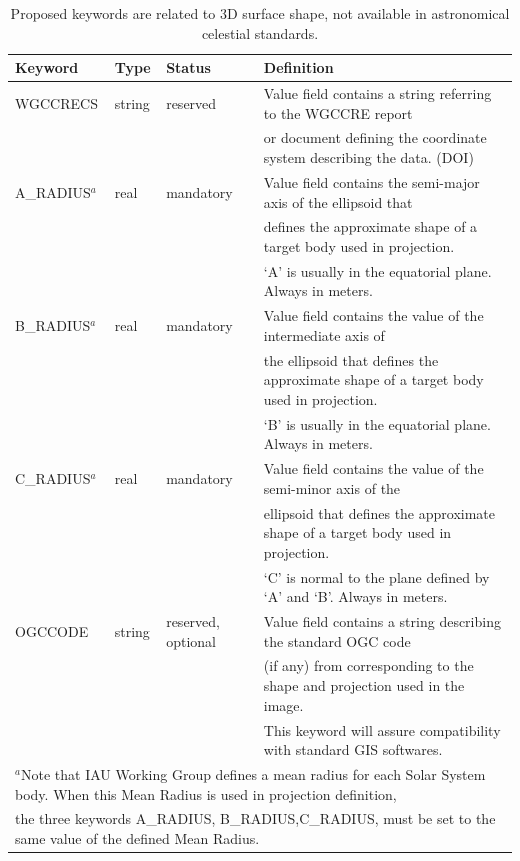 \begin{table}
\caption{Proposed keywords are related to 3D surface shape,
not available in astronomical celestial standards.}
\centering
\begin{tabular}{l l l l}
\hline
Keyword & Type & Status & Definition  \\
\hline
WGCCRECS & string & reserved & Value field contains a string referring to the WGCCRE report \\
& & & or document defining the coordinate system describing the data. (DOI)    \\
A\_RADIUS$^{a}$ & real & mandatory & Value field contains the semi-major axis of the ellipsoid that \\
& & & defines the approximate shape of a target body used in projection. \\
& & & `A' is usually in the equatorial plane. Always in meters.  \\
B\_RADIUS$^{a}$ & real & mandatory & Value field contains the value of the intermediate axis of \\
& & & the ellipsoid that defines the approximate shape of a target body used in projection. \\
& & & `B' is usually in the equatorial plane. Always in meters.   \\
C\_RADIUS$^{a}$ & real & mandatory & Value field contains the value of the semi-minor axis of the \\
& & & ellipsoid that defines the approximate shape of a target body used in projection. \\
& & & `C' is normal to the plane defined by `A' and `B'. Always in meters. \\
OGCCODE	& string & reserved, optional & Value field contains a string describing the standard OGC code \\
& & & (if any) from \citet{hare2006} corresponding to the shape and projection used in the image. \\
& & & This keyword will assure compatibility with standard GIS softwares. \\
\hline
\multicolumn{4}{l}{$^{a}$Note that IAU Working Group defines a mean radius for each Solar System body. When this Mean Radius is used in projection definition,} \\
\multicolumn{4}{l}{  the three keywords A\_RADIUS, B\_RADIUS,C\_RADIUS, must be set to the same value of the defined Mean Radius.} \\
\end{tabular}
\label{table:newkeys}
\end{table}

